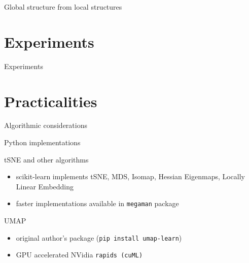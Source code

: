 \documentclass[unknownkeysallowed]{beamer}
\begin{document}
\begin{frame}{Global structure from local structures}

\end{frame}

\section{Experiments}

\begin{frame}{Experiments}

\end{frame}

\section{Practicalities}
\begin{frame}{Algorithmic considerations}

\end{frame}

\begin{frame}{Python implementations}

	\begin{block}{tSNE and other algorithms}
		\begin{itemize}
			\item scikit-learn implements tSNE, MDS, Isomap, Hessian Eigenmaps, Locally Linear Embedding
			\item faster implementations available in \texttt{megaman} package
		\end{itemize}
	\end{block}
	
	\begin{block}{UMAP}
		\begin{itemize}
			\item original author's package (\texttt{pip install umap-learn})
			\item GPU accelerated NVidia \texttt{rapids (cuML)} 
		\end{itemize}
	\end{block}
\end{frame}
\end{document}
